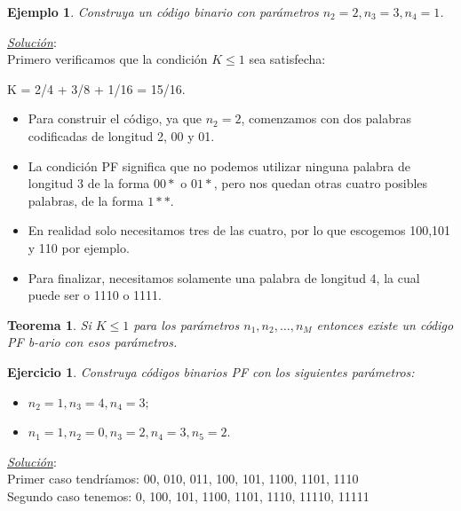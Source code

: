 \documentclass{beamer}
\newtheorem{teorema} [Teorema] {Teorema}
\newtheorem{ejemplo} [Ejemplo] {Ejemplo}
\newtheorem{ejercicio} [Corolario]{Ejercicio}
\begin{document}


\begin{frame}      \small
 
 \begin{ejemplo}
Construya un código binario con parámetros  $n_{2}=2, n_{3}=3, n_{4}=1$.
\end{ejemplo}

\pause
\textit{\underline{Solución}}:\\

 Primero verificamos que la condición $K \leq 1$ sea satisfecha:

\begin{center}
 K = 2/4 + 3/8 + 1/16 = 15/16.
\end{center}
 
 \begin{itemize}
\item  Para construir el código, ya que $n_{2}=2$, comenzamos con dos palabras codificadas de longitud 2, 00 y 01. 

\item  La condición PF significa que no podemos utilizar ninguna palabra de longitud 3 de la forma $00*$ o $01*$, pero nos quedan otras cuatro posibles palabras, de la forma $1**$. 


\item En realidad solo necesitamos tres de las cuatro, por lo que escogemos 100,101 y 110 por ejemplo. 

\item Para finalizar, necesitamos solamente una palabra de longitud 4, la cual puede ser o 1110 o 1111.

\end{itemize}
 
 
 
 
 


\end{frame}




\begin{frame}      \small
 
 \begin{teorema}\label{theorem:CPF}
Si $K \leq 1$ para los parámetros $n_{1}, n_{2}, \ldots, n_{M}$ entonces existe un código PF b-ario con esos parámetros.
\end{teorema}


 \begin{ejercicio}

Construya códigos binarios PF con los siguientes parámetros:
\begin{itemize}
\item $n_2 =1,n_3 =4,n_4 =3;$
\item $n_1 =1,n_2 =0,n_3 =2,n_4 =3,n_5 =2.$
\end{itemize}

\end{ejercicio}
\pause
\textit{\underline{Solución}}:\\
Primer caso tendríamos: 00, 010, 011, 100, 101, 1100, 1101, 1110\\

Segundo caso tenemos: 0, 100, 101, 1100, 1101, 1110, 11110, 11111
\end{frame}
\end{document}
